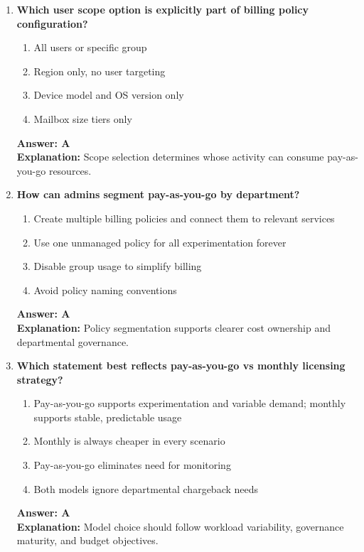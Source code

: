 \documentclass[10pt]{article}
\begin{document}
\begin{enumerate}[leftmargin=*]
\item \textbf{Which user scope option is explicitly part of billing policy configuration?}
\begin{enumerate}[label=\Alph*.]
  \item All users or specific group
  \item Region only, no user targeting
  \item Device model and OS version only
  \item Mailbox size tiers only
\end{enumerate}
\textbf{Answer: A}\\
\textbf{Explanation:} Scope selection determines whose activity can consume pay-as-you-go resources.

\item \textbf{How can admins segment pay-as-you-go by department?}
\begin{enumerate}[label=\Alph*.]
  \item Create multiple billing policies and connect them to relevant services
  \item Use one unmanaged policy for all experimentation forever
  \item Disable group usage to simplify billing
  \item Avoid policy naming conventions
\end{enumerate}
\textbf{Answer: A}\\
\textbf{Explanation:} Policy segmentation supports clearer cost ownership and departmental governance.

\item \textbf{Which statement best reflects pay-as-you-go vs monthly licensing strategy?}
\begin{enumerate}[label=\Alph*.]
  \item Pay-as-you-go supports experimentation and variable demand; monthly supports stable, predictable usage
  \item Monthly is always cheaper in every scenario
  \item Pay-as-you-go eliminates need for monitoring
  \item Both models ignore departmental chargeback needs
\end{enumerate}
\textbf{Answer: A}\\
\textbf{Explanation:} Model choice should follow workload variability, governance maturity, and budget objectives.


\end{enumerate}
\end{document}
